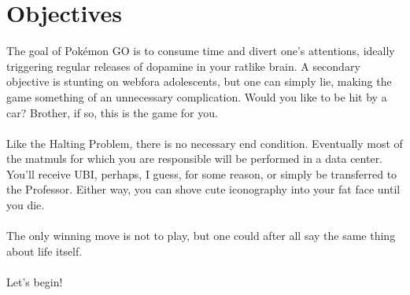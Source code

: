 \chapter{Objectives}
\label{sec:goal}
The goal of Pokémon GO is to consume time and divert one's attentions,
  ideally triggering regular releases of dopamine in your ratlike brain.
A secondary objective is stunting on webfora adolescents, but one
  can simply lie, making the game something of an unnecessary complication.
Would you like to be hit by a car? Brother, if so, this is the game for you.\\
\\
Like the Halting Problem, there is no necessary end condition.
Eventually most of the matmuls for which you are responsible will be performed in a data center.
You'll receive UBI, perhaps, I guess, for some reason, or simply be transferred to the Professor.
Either way, you can shove cute iconography into your fat face until you die.\\
\\
The only winning move is not to play, but one could after all say the same
  thing about life itself.\\
\\
Let's begin!
